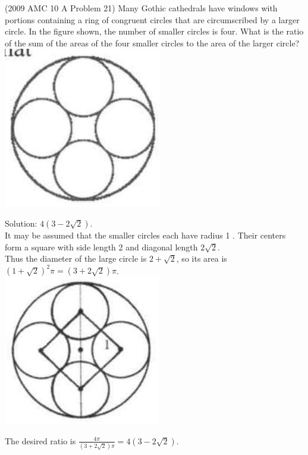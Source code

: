\documentclass{article}
\begin{document}
(2009 AMC 10 A Problem 21) Many Gothic cathedrals have windows with portions containing a ring of congruent circles that are circumscribed by a larger circle. In the figure shown, the number of smaller circles is four. What is the ratio of the sum of the areas of the four smaller circles to the area of the larger circle?\\
\centering
\includegraphics[width=\textwidth]{images/182(1).jpg}

Solution: \(4(3-2 \sqrt{2})\).\\
It may be assumed that the smaller circles each have radius 1 . Their centers form a square with side length 2 and diagonal length \(2 \sqrt{2}\).\\
Thus the diameter of the large circle is \(2+\sqrt{2}\), so its area is \((1+\sqrt{2})^{2} \pi=(3+2 \sqrt{2}) \pi\).\\
\centering
\includegraphics[width=\textwidth]{images/182(2).jpg}


The desired ratio is \(\frac{4 \pi}{(3+2 \sqrt{2}) \pi}=4(3-2 \sqrt{2})\).
\end{document}
